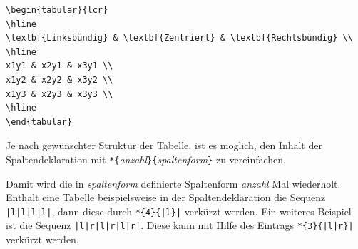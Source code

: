 \documentclass[a4paper,10pt,twoside]{scrbook}
\begin{document}
\begin{lstlisting}[caption={Ohne vertikale und mit weniger horizontalen Linien wirkt die Tabelle eleganter},label=drittetabellenbeispiel, style=customlatex]
\begin{tabular}{lcr}
\hline
\textbf{Linksbündig} & \textbf{Zentriert} & \textbf{Rechtsbündig} \\
\hline
x1y1 & x2y1 & x3y1 \\
x1y2 & x2y2 & x3y2 \\
x1y3 & x2y3 & x3y3 \\
\hline
\end{tabular}
\end{lstlisting}

Je nach gewünschter Struktur der Tabelle, ist es möglich, den Inhalt der Spaltendeklaration mit 
\verb!*{!\textsl{anzahl}\verb!}{!\textsl{spaltenform}\verb!}! zu vereinfachen.

Damit wird die in \textsl{spaltenform} definierte
Spaltenform \textsl{anzahl} Mal wiederholt. Enthält eine Tabelle beispielsweise in der Spaltendeklaration die Sequenz \verb!|l|l|l|l|!, dann diese durch \verb!*{4}{|l}|! verkürzt werden. Ein weiteres Beispiel ist die Sequenz \verb!|l|r|l|r|l|r|!. Diese kann mit Hilfe des Eintrags \verb!*{3}{|l|r}|! verkürzt werden.
\end{document}
